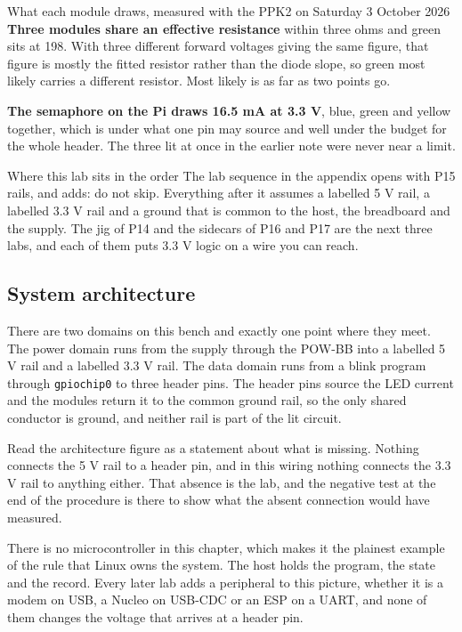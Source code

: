 \begin{note}{What each module draws, measured with the PPK2 on Saturday 3 October 2026}
\textbf{Three modules share an effective resistance} within three ohms and green sits at 198. With three different forward voltages giving the same figure, that figure is mostly the fitted resistor rather than the diode slope, so green most likely carries a different resistor. Most likely is as far as two points go.

\textbf{The semaphore on the Pi draws 16.5 mA at 3.3 V}, blue, green and yellow together, which is under what one pin may source and well under the budget for the whole header. The three lit at once in the earlier note were never near a limit.
\end{note}

\begin{note}{Where this lab sits in the order}
The lab sequence in the appendix opens with P15 rails, and adds: do not skip. Everything after it assumes a labelled 5 V rail, a labelled 3.3 V rail and a ground that is common to the host, the breadboard and the supply. The jig of P14 and the sidecars of P16 and P17 are the next three labs, and each of them puts 3.3 V logic on a wire you can reach.
\end{note}

\subsection*{System architecture}


There are two domains on this bench and exactly one point where they meet. The power domain runs from the supply through the POW-BB into a labelled 5 V rail and a labelled 3.3 V rail. The data domain runs from a blink program through \texttt{gpiochip0} to three header pins. The header pins source the LED current and the modules return it to the common ground rail, so the only shared conductor is ground, and neither rail is part of the lit circuit.

Read the architecture figure as a statement about what is missing. Nothing connects the 5 V rail to a header pin, and in this wiring nothing connects the 3.3 V rail to anything either. That absence is the lab, and the negative test at the end of the procedure is there to show what the absent connection would have measured.

There is no microcontroller in this chapter, which makes it the plainest example of the rule that Linux owns the system. The host holds the program, the state and the record. Every later lab adds a peripheral to this picture, whether it is a modem on USB, a Nucleo on USB-CDC or an ESP on a UART, and none of them changes the voltage that arrives at a header pin.

